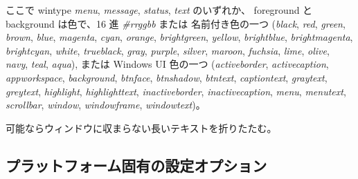 ここで wintype {\it menu}, {\it message}, {\it status}, {\it text} のいずれか、
foreground と background は色で、16 進 {\it \#rrggbb} または
名前付き色の一つ ({\it black}, {\it red}, {\it green}, {\it brown},
{\it blue}, {\it magenta}, {\it cyan}, {\it orange},
{\it brightgreen}, {\it yellow}, {\it brightblue}, {\it brightmagenta},
{\it brightcyan}, {\it white}, {\it trueblack}, {\it gray}, {\it purple},
{\it silver}, {\it maroon}, {\it fuchsia}, {\it lime}, {\it olive},
{\it navy}, {\it teal}, {\it aqua}),
または Windows UI 色の一つ ({\it activeborder},
{\it activecaption}, {\it appworkspace}, {\it background}, {\it btnface}, {\it btnshadow},
{\it btntext}, {\it captiontext}, {\it graytext}, {\it greytext}, {\it highlight},
{\it highlighttext}, {\it inactiveborder}, {\it inactivecaption}, {\it menu},
{\it menutext}, {\it scrollbar}, {\it window}, {\it windowframe}, {\it windowtext})。

\item[\ib{wraptext}]
可能ならウィンドウに収まらない長いテキストを折りたたむ。
\elist

\subsection*{プラットフォーム固有の設定オプション}

